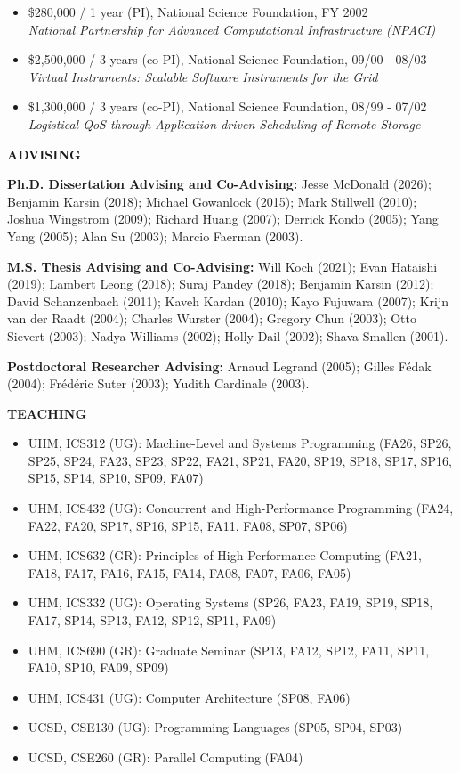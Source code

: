 \documentclass[times,11pt]{letter}
\begin{document}
\begin{itemize}
\item[-] \$280,000 / 1 year (PI), National Science Foundation, FY 2002~\\
      \emph{National Partnership for Advanced Computational Infrastructure (NPACI)}

\item[-] \$2,500,000 / 3 years (co-PI), National Science Foundation, 09/00 - 08/03~\\
{\it Virtual Instruments: Scalable Software Instruments for the Grid}

\item[-] \$1,300,000 / 3 years (co-PI), National Science Foundation, 08/99 - 07/02~\\
{\it Logistical QoS through Application-driven Scheduling of Remote Storage}

\end{itemize}

\noindent
{\large{\bf ADVISING}}


\noindent
{\bf Ph.D. Dissertation Advising and Co-Advising:}
 Jesse McDonald (2026);
 Benjamin Karsin (2018); 
 Michael Gowanlock (2015);
 Mark Stillwell (2010); 
 Joshua Wingstrom (2009);
 Richard Huang (2007); 
 Derrick Kondo (2005);
 Yang Yang (2005);
 Alan Su (2003);
 Marcio Faerman (2003).

\noindent
{\bf M.S. Thesis Advising and Co-Advising:}
 Will Koch (2021);
 Evan Hataishi (2019);
 Lambert Leong (2018);
 Suraj Pandey (2018);
 Benjamin Karsin (2012);
 David Schanzenbach (2011);
 Kaveh Kardan (2010);
 Kayo Fujuwara (2007);
 Krijn van der Raadt (2004);
 Charles Wurster (2004);
 Gregory Chun (2003);
 Otto Sievert (2003);
 Nadya Williams (2002);
 Holly Dail (2002);
 Shava Smallen (2001).

\noindent
{\bf Postdoctoral Researcher Advising:}
 Arnaud Legrand (2005);
 Gilles F\'edak (2004);
 Fr\'ed\'eric Suter (2003);
 Yudith Cardinale (2003).


\noindent
{\large{\bf TEACHING}}


\begin{itemize}
\item [-] UHM, ICS312 (UG): Machine-Level and Systems Programming (FA26, SP26, SP25, SP24, FA23, SP23, SP22, FA21, SP21, FA20, SP19, SP18, SP17, SP16, SP15, SP14, SP10, SP09, FA07)
\item [-] UHM, ICS432 (UG): Concurrent and High-Performance Programming (FA24, FA22, FA20, SP17, SP16, SP15, FA11, FA08, SP07, SP06)
\item [-] UHM, ICS632 (GR): Principles of High Performance Computing (FA21, FA18, FA17, FA16, FA15, FA14, FA08, FA07, FA06, FA05)
\item [-] UHM, ICS332 (UG): Operating Systems (SP26, FA23, FA19, SP19, SP18, FA17, SP14, SP13, FA12, SP12, SP11, FA09)
\item [-] UHM, ICS690 (GR): Graduate Seminar (SP13, FA12, SP12, FA11, SP11, FA10, SP10, FA09, SP09)
\item [-] UHM, ICS431 (UG): Computer Architecture (SP08, FA06)
\item [-] UCSD, CSE130 (UG): Programming Languages (SP05, SP04, SP03)
\item [-] UCSD, CSE260 (GR): Parallel Computing (FA04)
\end{itemize}
\end{document}

